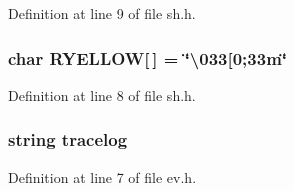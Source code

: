 Definition at line 9 of file sh.\+h.

\subsubsection[{\texorpdfstring{R\+Y\+E\+L\+L\+OW}{RYELLOW}}]{\setlength{\rightskip}{0pt plus 5cm}char R\+Y\+E\+L\+L\+OW\mbox{[}$\,$\mbox{]} = \char`\"{}\textbackslash{}033\mbox{[}0;33m\char`\"{}}\hypertarget{namespace_k_abd378d9900fa5f1effc177ef1a3eaf88}{}\label{namespace_k_abd378d9900fa5f1effc177ef1a3eaf88}


Definition at line 8 of file sh.\+h.

\subsubsection[{\texorpdfstring{tracelog}{tracelog}}]{\setlength{\rightskip}{0pt plus 5cm}string tracelog}\hypertarget{namespace_k_a8cf9916382d8c2046656233c4422022d}{}\label{namespace_k_a8cf9916382d8c2046656233c4422022d}


Definition at line 7 of file ev.\+h.

